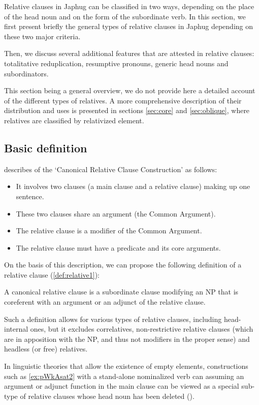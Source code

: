 \documentclass[oldfontcommands,oneside,a4paper,11pt]{article}
\begin{document}
Relative clauses in Japhug can be classified in two ways, depending on the place of the head noun and on the form of the subordinate verb. In this section, we first present briefly the general types of relative clauses in Japhug depending on these two major criteria. 

Then, we discuss several additional features that are attested in relative clauses: totalitative reduplication, resumptive pronouns, generic head nouns and subordinators.

This section being a general overview, we do not provide here a detailed account of the different types of relatives. A more comprehensive description of their distribution and uses is presented in sections \ref{sec:core}  and \ref{sec:oblique}, where relatives are classified by relativized element.

\subsection{Basic definition}
 \citet[314]{dixon10basic2}  describes of the `Canonical Relative Clause Construction' as follows:
 
\begin{itemize}
\item It involves two clauses (a main clause and a relative clause) making up one sentence. 
\item These two clauses share an argument (the Common Argument). 
\item The relative clause is a modifier of the Common Argument. 
\item The relative clause must have a predicate and its core arguments. 
\end{itemize}

On the basis of this description, we can propose  the following definition of a relative clause (\ref{def:relative1}):

\begin{exe}
\ex \label{def:relative1}
\glt A canonical relative clause is  a subordinate clause modifying an NP    that is coreferent with an argument or an adjunct of the relative clause. 
\end{exe}
 
Such a definition allows for various types of relative clauses, including head-internal ones, but it excludes correlatives, non-restrictive relative clauses (which are in apposition with the NP, and thus not modifiers in the proper sense) and headless (or free) relatives.

In linguistic theories that  allow the existence of empty elements, constructions such as \ref{ex:pWkAsat2} with a stand-alone nominalized verb can assuming an argument or adjunct function in the main clause can be viewed as a special sub-type of relative clauses whose head noun has been deleted (\citealt[197-205]{dryer07noun.phrase}). 
\end{document}
